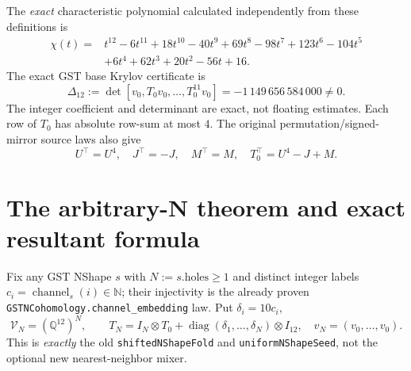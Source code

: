 \documentclass[11pt]{article}
\newcommand{\Q}{\mathbb Q}
\begin{document}
The \emph{exact} characteristic polynomial calculated independently from these definitions is
\[
\begin{split}
 \chi(t)={}&t^{12}-6t^{11}+18t^{10}-40t^9+69t^8-98t^7
  +123t^6-104t^5\\
 &+6t^4+62t^3+20t^2-56t+16.
\end{split}
\]
The exact GST base Krylov certificate is
\[
 \boxed{\Delta_{12}:=\det[v_0,T_0v_0,\ldots,T_0^{11}v_0]
 =-1\,149\,656\,584\,000\ne0.}\tag{1}
\]
The integer coefficient and determinant are exact, not floating estimates. Each row of $T_0$ has absolute row-sum at most $4$. The original permutation/signed-mirror source laws also give
\[
 \boxed{U^\top=U^4,\quad J^\top=-J,\quad M^\top=M,\quad
 T_0^\top=U^4-J+M.}\tag{2}
\]

\section{The arbitrary-N theorem and exact resultant formula}
Fix any GST NShape $s$ with $N:=s.\mathrm{holes}\ge1$ and distinct integer labels
$c_i=\operatorname{channel}_s(i)\in\mathbb N$; their injectivity is the already proven \texttt{GSTNCohomology.channel\_embedding} law. Put $\delta_i=10c_i$,
\[
 \mathscr V_N=(\Q^{12})^N,\qquad
 T_N=I_N\otimes T_0+\operatorname{diag}(\delta_1,\ldots,\delta_N)\otimes I_{12},
 \quad v_N=(v_0,\ldots,v_0).
\]
This is \emph{exactly} the old \texttt{shiftedNShapeFold} and \texttt{uniformNShapeSeed}, not the optional new nearest-neighbor mixer.
\end{document}
